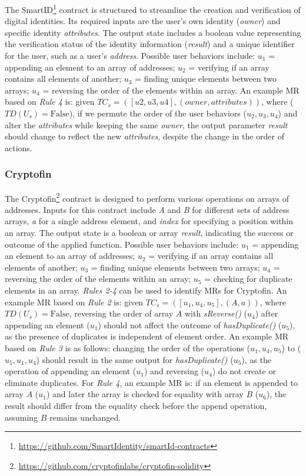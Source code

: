 The SmartID\footnote{\url{https://github.com/SmartIdentity/smartId-contracts}} contract is structured to streamline the creation and verification of digital identities. Its required inputs are the user's own identity (\textit{owner}) and specific identity \textit{attributes}. The output state includes a boolean value representing the verification status of the identity information (\textit{result}) and a unique identifier for the user, such as a user's \textit{address}. Possible user behaviors include: \(u_1\) = appending an element to an array of addresses; \(u_2\) = verifying if an array contains all elements of another; \(u_3\) = finding unique elements between two arrays; \(u_4\) = reversing the order of the elements within an array. An example MR based on \textit{Rule 4} is: given \(TC_s = ([u2,u3,u4],(owner, attributes))\), where (\(TD(U_s) = \text{False}\)), if we permute the order of the user behaviors (\(u_2, u_3, u_4\)) and alter the \textit{attributes} while keeping the same \textit{owner}, the output parameter \textit{result} should change to reflect the new \textit{attributes}, despite the change in the order of actions.

\subsubsection{Cryptofin}

The Cryptofin\footnote{\url{https://github.com/cryptofinlabs/cryptofin-solidity}} contract is designed to perform various operations on arrays of addresses. Inputs for this contract include \textit{A} and \textit{B} for different sets of address arrays, \textit{a} for a single address element, and \textit{index} for specifying a position within an array. The output state is a boolean or array \textit{result}, indicating the success or outcome of the applied function. Possible user behaviors include: \(u_1\) = appending an element to an array of addresses; \(u_2\) = verifying if an array contains all elements of another; \(u_3\) = finding unique elements between two arrays; \(u_4\) = reversing the order of the elements within an array; \(u_5\) = checking for duplicate elements in an array. \textit{Rules 2-4} can be used to identify MRs for Cryptofin. An example MR based on \textit{Rule 2} is: given \(TC_s = ([u_1,u_4,u_5],(A, a))\), where \(TD(U_s) = \text{False}\), reversing the order of array \(A\) with \textit{sReverse()} (\(u_4\)) after appending an element (\(u_1\)) should not affect the outcome of \textit{hasDuplicate()} (\(u_5\)), as the presence of duplicates is independent of element order. An example MR based on \textit{Rule 3} is as follows: changing the order of the operations (\(u_1, u_4, u_5\)) to (\(u_5, u_1, u_4\)) should result in the same output for \textit{hasDuplicate()} (\(u_5\)), as the operation of appending an element (\(u_1\)) and reversing (\(u_4\)) do not create or eliminate duplicates. For \textit{Rule 4}, an example MR is: if an element is appended to array \(A\) (\(u_1\)) and later the array is checked for equality with array \(B\) (\(u_6\)), the result should differ from the equality check before the append operation, assuming \(B\) remains unchanged.

